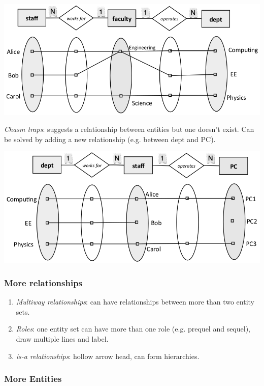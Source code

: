 \documentclass[twocolumn,english]{article}
\begin{document}
\begin{center}
\includegraphics[scale=0.2]{img/fan}
\par\end{center}

\noindent \emph{Chasm traps}: suggests a relationship between entities
but one doesn't exist. Can be solved by adding a new relationship
(e.g. between dept and PC).

\begin{center}
\includegraphics[scale=0.2]{img/chasm}
\par\end{center}


\subsubsection{More relationships}
\begin{enumerate}
\item \emph{Multiway relationships}: can have relationships between more
than two entity sets. 
\item \emph{Roles}: one entity set can have more than one role (e.g. prequel
and sequel), draw multiple lines and label. 
\item \emph{is-a relationships}: hollow arrow head, can form hierarchies. 
\end{enumerate}

\subsubsection{More Entities}
\end{document}
